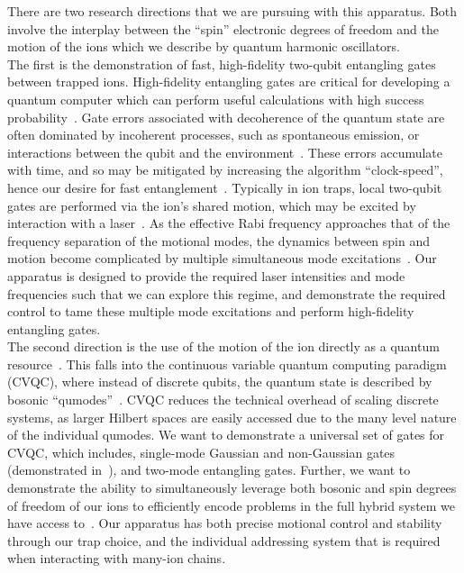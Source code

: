     There are two research directions that we are pursuing with this apparatus.
    Both involve the interplay between the ``spin'' electronic degrees
    of freedom and the motion of the ions which we describe by quantum harmonic
    oscillators.\\
    The first is the demonstration of fast, high-fidelity two-qubit
    entangling gates between trapped ions. High-fidelity entangling gates are
    critical for developing a quantum computer which can perform useful
    calculations with high success probability~\cite{steane2003overhead}. Gate errors associated with
    decoherence of the quantum state are often dominated by incoherent
    processes, such as spontaneous emission, or interactions between the qubit
    and the environment~\cite{wineland1998experimental}. These errors accumulate with time, and so may be
    mitigated by increasing the algorithm ``clock-speed'', hence our desire for
    fast entanglement~\cite{steane2000speed,schafer2018fast}. Typically in ion traps, local two-qubit gates are
    performed via the ion's shared motion, which may be excited by interaction
    with a laser~\cite{cirac1995quantum, sorensen2000entanglement}. As the effective Rabi frequency approaches that of the
    frequency separation of the motional modes, the dynamics between spin and
    motion become complicated by multiple simultaneous mode excitations~\cite{schafer2018fast}. Our
    apparatus is designed to provide the required laser intensities and mode
    frequencies such that we can explore this regime, and demonstrate the
    required control to tame these multiple mode excitations and perform
    high-fidelity entangling gates.\\
    The second direction is the use of the motion of the ion directly as a
    quantum resource~\cite{liu2024hybrid,chen2021quantum}. This falls into the continuous variable quantum computing
    paradigm (CVQC), where instead of discrete qubits, the quantum state is
    described by bosonic ``qumodes''~\cite{lloyd1999quantum}. CVQC reduces the
    technical overhead of scaling discrete systems, as larger Hilbert spaces are
    easily accessed due to the many level nature of the individual qumodes.
    We want to demonstrate a
    universal set of gates for CVQC, which includes, single-mode Gaussian and
    non-Gaussian gates (demonstrated in~\cite{bazavan2024squeezing}), and two-mode entangling gates. Further, we want to demonstrate the ability to simultaneously leverage both
    bosonic and spin degrees of freedom of our ions to efficiently encode
    problems in the full hybrid system we have access to~\cite{varona2024towards, brenner2024factoring}. Our apparatus has both
    precise motional control and stability through our trap choice, and the
    individual addressing system that is required when interacting with many-ion
    chains.\\
    
